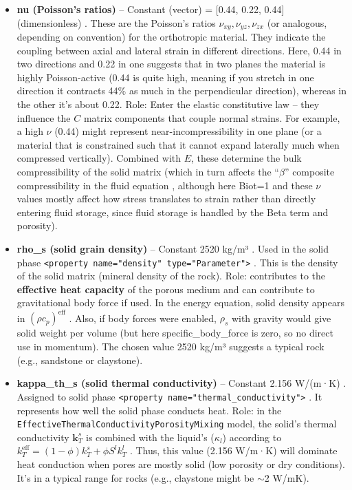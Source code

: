 \documentclass[10pt,a4paper]{article}
\begin{document}
\begin{itemize}
    \item \textbf{nu (Poisson's ratios)} – Constant (vector) = [0.44, 0.22, 0.44] (dimensionless) \cite{file:03_parameters_TRM}. These are the Poisson's ratios $\nu_{xy}, \nu_{yz}, \nu_{zx}$ (or analogous, depending on convention) for the orthotropic material. They indicate the coupling between axial and lateral strain in different directions. Here, 0.44 in two directions and 0.22 in one suggests that in two planes the material is highly Poisson-active (0.44 is quite high, meaning if you stretch in one direction it contracts 44\% as much in the perpendicular direction), whereas in the other it's about 0.22. Role: Enter the elastic constitutive law -- they influence the $C$ matrix components that couple normal strains. For example, a high $\nu$ (0.44) might represent near-incompressibility in one plane (or a material that is constrained such that it cannot expand laterally much when compressed vertically). Combined with $E$, these determine the bulk compressibility of the solid matrix (which in turn affects the “$\beta$” composite compressibility in the fluid equation \cite{ogs:trm}, although here Biot=1 and these $\nu$ values mostly affect how stress translates to strain rather than directly entering fluid storage, since fluid storage is handled by the Beta term and porosity).

    \item \textbf{rho\_s (solid grain density)} – Constant 2520 kg/m³ \cite{file:03_parameters_TRM}. Used in the solid phase \texttt{<property name="density" type="Parameter">} \cite{file:04_media_TRM}. This is the density of the solid matrix (mineral density of the rock). Role: contributes to the \textbf{effective heat capacity} of the porous medium and can contribute to gravitational body force if used. In the energy equation, solid density appears in $(\rho c_p)^{\text{eff}}$ \cite{ogs:trm}. Also, if body forces were enabled, $\rho_s$ with gravity would give solid weight per volume (but here specific\_body\_force is zero, so no direct use in momentum). The chosen value 2520 kg/m³ suggests a typical rock (e.g., sandstone or claystone).

    \item \textbf{kappa\_th\_s (solid thermal conductivity)} – Constant 2.156 W/(m·K) \cite{file:03_parameters_TRM}. Assigned to solid phase \texttt{<property name="thermal\_conductivity">} \cite{file:04_media_TRM}. It represents how well the solid phase conducts heat. Role: in the \texttt{EffectiveThermalConductivityPorosityMixing} model, the solid's thermal conductivity $\mathbf{k}_T^s$ is combined with the liquid's ($\kappa_l$) according to $k_T^{\text{eff}} = (1-\phi) k_T^s + \phi S^l k_T^l$ \cite{ogs:trm}. Thus, this value (2.156 W/m·K) will dominate heat conduction when pores are mostly solid (low porosity or dry conditions). It's in a typical range for rocks (e.g., claystone might be $\sim$2 W/mK).


\end{itemize}
\end{document}
